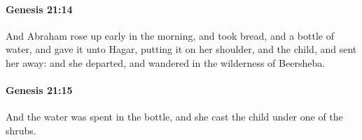 		\paragraph{Genesis 21:14} %
			\label{GENESIS-21-14}

			And Abraham rose up early in the morning, and took bread, and a bottle of water, and gave it unto Hagar, putting it on her shoulder, and the child, and sent her away: and she departed, and wandered in the wilderness of Beersheba.


		\paragraph{Genesis 21:15} %
			\label{GENESIS-21-15}

			And the water was spent in the bottle, and she cast the child under one of the shrubs.


